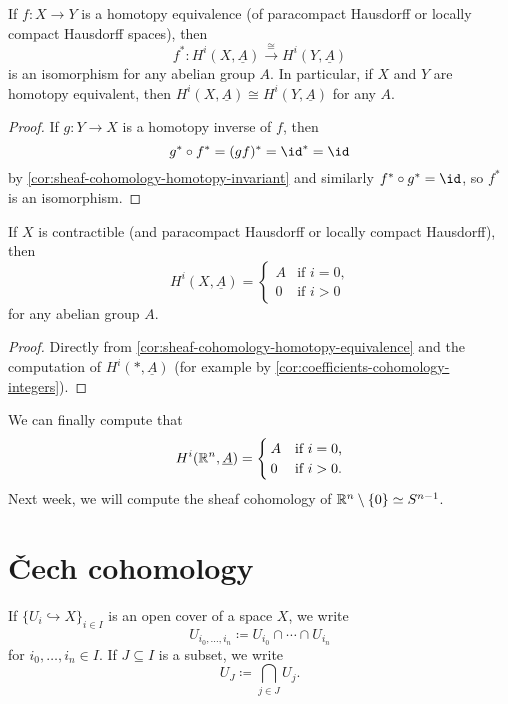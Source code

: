 \begin{cor}\label{cor:sheaf-cohomology-homotopy-equivalence}
If \(f\colon X\to Y\) is a homotopy equivalence (of paracompact Hausdorff or locally compact Hausdorff spaces), then
\[ f^*\colon H^i(X,\underline{A})\xrightarrow{\cong} H^i(Y,\underline{A}) \]
is an isomorphism for any abelian group \(A\).
In particular, if \(X\) and \(Y\) are homotopy equivalent, then \(H^i(X,\underline{A})\cong H^i(Y,\underline{A})\) for any \(A\).
\end{cor}
\begin{proof}
If \(g\colon Y\to X\) is a homotopy inverse of \(f\), then
\[ g^*\circ f^* = (gf)^* = \id^* = \id \]
by \cref{cor:sheaf-cohomology-homotopy-invariant} and similarly \(f^*\circ g^*=\id\), so \(f^*\) is an isomorphism.
\end{proof}

\begin{cor}
If \(X\) is contractible (and paracompact Hausdorff or locally compact Hausdorff), then
\[ H^i(X,\underline{A}) =
  \begin{cases}
    A & \text{if } i = 0\text{,} \\
    0 & \text{if } i > 0
  \end{cases}
\]
for any abelian group \(A\).
\end{cor}
\begin{proof}
Directly from \cref{cor:sheaf-cohomology-homotopy-equivalence} and the computation of \(H^i(*,\underline{A})\) (for example by \cref{cor:coefficients-cohomology-integers}).
\end{proof}

\begin{exmp}
We can finally compute that
\[ H^i(\mathbb{R}^n,\underline{A}) =
  \begin{cases}
    A & \text{if } i = 0\text{,} \\
    0 & \text{if } i > 0\text{.}
  \end{cases}
\]
Next week, we will compute the sheaf cohomology of \(\bb R^n\setminus\{0\}\simeq\sphere[n-1]\).
\end{exmp}

\section{Čech cohomology}

\begin{notn}
If \(\{U_i\hookrightarrow X\}_{i\in I}\) is an open cover of a space \(X\), we write
\[ U_{i_0,\ldots,i_n} \coloneq U_{i_0} \cap \cdots \cap U_{i_n} \]
for \(i_0,\ldots,i_n\in I\).
If \(J\subseteq I\) is a subset, we write
\[ U_J \coloneq \bigcap_{j\in J}U_j\text{.} \]
\end{notn}

